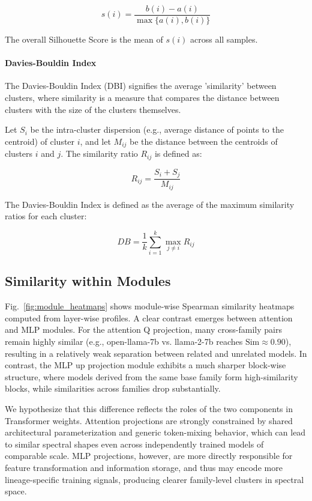 \begin{equation}
    s(i) = \frac{b(i) - a(i)}{\max\{a(i), b(i)\}}
\end{equation}

The overall Silhouette Score is the mean of $s(i)$ across all samples.

\paragraph{Davies-Bouldin Index}
The Davies-Bouldin Index (DBI) signifies the average 'similarity' between clusters, where similarity is a measure that compares the distance between clusters with the size of the clusters themselves.

Let $S_i$ be the intra-cluster dispersion (e.g., average distance of points to the centroid) of cluster $i$, and let $M_{ij}$ be the distance between the centroids of clusters $i$ and $j$. The similarity ratio $R_{ij}$ is defined as:

\begin{equation}
    R_{ij} = \frac{S_i + S_j}{M_{ij}}
\end{equation}

The Davies-Bouldin Index is defined as the average of the maximum similarity ratios for each cluster:

\begin{equation}
    DB = \frac{1}{k} \sum_{i=1}^{k} \max_{j \neq i} R_{ij}
\end{equation}


\subsection{Similarity within Modules}
\label{sec:similarity_within_modules}
Fig.~\ref{fig:module_heatmaps} shows module-wise Spearman similarity heatmaps computed from layer-wise \ALPHAHILL profiles.
A clear contrast emerges between attention and MLP modules.
For the attention Q projection, many cross-family pairs remain highly similar (e.g., open-llama-7b vs. llama-2-7b reaches $\mathrm{Sim} \approx 0.90$), resulting in a relatively weak separation between related and unrelated models.
In contrast, the MLP up projection module exhibits a much sharper block-wise structure, where models derived from the same base family form high-similarity blocks, while similarities across families drop substantially.

We hypothesize that this difference reflects the roles of the two components in Transformer weights.
Attention projections are strongly constrained by shared architectural parameterization and generic token-mixing behavior, which can lead to similar spectral shapes even across independently trained models of comparable scale.
MLP projections, however, are more directly responsible for feature transformation and information storage, and thus may encode more lineage-specific training signals, producing clearer family-level clusters in spectral space.

